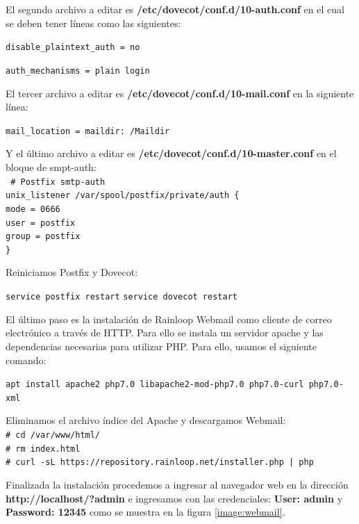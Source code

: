 El segundo archivo a editar es \textbf{/etc/dovecot/conf.d/10-auth.conf} en el cual se deben tener líneas como las siguientes:

\texttt{disable\_plaintext\_auth = no}

\texttt{auth\_mechanisms = plain login}

El tercer archivo a editar es \textbf{ /etc/dovecot/conf.d/10-mail.conf} en la siguiente línea:

\texttt{mail\_location = maildir:~/Maildir}

Y el último archivo a editar es \textbf{/etc/dovecot/conf.d/10-master.conf} en el bloque de smpt-auth:\\

\texttt{
\# Postfix smtp-auth \\
  	unix\_listener /var/spool/postfix/private/auth \{\\
  	mode = 0666\\
  	user = postfix\\
  	group = postfix\\
 	\}}
 	
Reiniciamos Postfix y Dovecot:

\texttt{service postfix restart}
\texttt{service dovecot restart}

El último paso es la instalación de Rainloop Webmail como cliente de correo electrónico a través de HTTP. Para ello se instala un servidor apache y las dependencias necesarias para utilizar PHP. Para ello, usamos el siguiente comando:

\texttt{apt install apache2 php7.0 libapache2-mod-php7.0 php7.0-curl php7.0-xml}

Eliminamos el archivo índice del Apache y descargamos Webmail:\\
\texttt{\# cd /var/www/html/}\\
\texttt{\# rm index.html}\\
\texttt{\# curl -sL https://repository.rainloop.net/installer.php | php}

Finalizada la instalación procedemos a ingresar al navegador web en la dirección \textbf{http://localhost/?admin} e ingresamos con las credenciales: \textbf{User: admin} y \textbf{Password: 12345} como se muestra en la figura \ref{image:webmail}.

